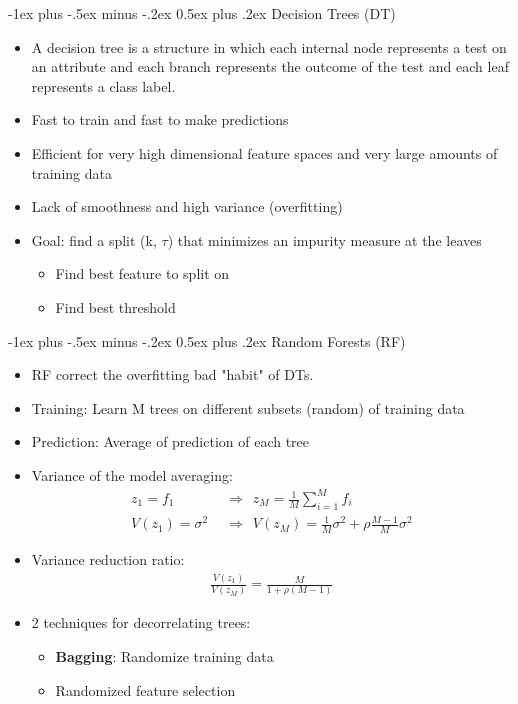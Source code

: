 \documentclass[10pt,a4paper,landscape]{article}
\makeatletter
\renewcommand{\section}{\@startsection{section}{1}{0mm}%
                                {-1ex plus -.5ex minus -.2ex}%
                                {0.5ex plus .2ex}%
                                {\normalfont\large\bfseries}}
\makeatother
\begin{document}
\begin{multicols*}{2}
\section{Decision Trees (DT)}
\begin{itemize}
    \item A decision tree is a structure in which each internal node represents a test on an attribute and each branch represents the outcome of the test and each leaf represents a class label.
    \item Fast to train and fast to make predictions
    \item Efficient for very high dimensional feature spaces and very large amounts of training data
    \item Lack of smoothness and high variance (overfitting)
    \item Goal: find a split (k, $\tau$) that minimizes an impurity measure at the leaves
    \begin{itemize}
        \item Find best feature to split on
        \item Find best threshold
    \end{itemize}
\end{itemize}

\section{Random Forests (RF)}
\begin{itemize}
    \item RF correct the overfitting bad "habit" of DTs.
    \item Training: Learn M trees on different subsets (random) of training data
    \item Prediction: Average of prediction of each tree
    \item Variance of the model averaging:
    \begin{align*}
        z_1 = f_1 \hspace{5pt} &\Rightarrow \hspace{5pt} z_M = \frac{1}{M} \sum_{i = 1}^M f_i \\
        V(z_1) = \sigma^2 \hspace{5pt} &\Rightarrow \hspace{5pt} V(z_M) = \frac{1}{M} \sigma^2 + \rho \frac{M - 1}{M} \sigma^2
    \end{align*}
    \item Variance reduction ratio:
    \begin{align*}
        \frac{V(z_1)}{V(z_M)} = \frac{M}{1 +\rho (M - 1)}
    \end{align*}
    \item 2 techniques for decorrelating trees:
    \begin{itemize}
        \item \textbf{Bagging}: Randomize training data
        \item Randomized feature selection
    \end{itemize}
\end{itemize}


\end{multicols*}
\end{document}
